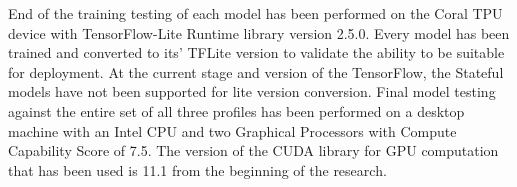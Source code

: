 %
End of the training testing of each model has been performed on the Coral TPU device with TensorFlow-Lite Runtime library version 2.5.0.
Every model has been trained and converted to its' TFLite version to validate the ability to be suitable for deployment.
At the current stage and version of the TensorFlow, the Stateful models have not been supported for lite version conversion.
Final model testing against the entire set of all three profiles has been performed on a desktop machine with an Intel CPU and two Graphical Processors with Compute Capability Score of 7.5.
The version of the CUDA library for GPU computation that has been used is 11.1 from the beginning of the research.
%
%




